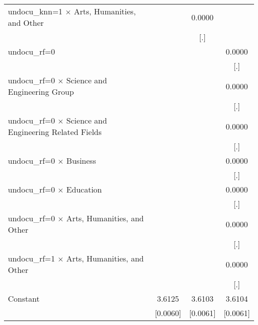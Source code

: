 \begin{table}[htbp]
\begin{tabular}{l*{3}{c}}
\addlinespace
undocu\_knn=1 $\times$ Arts, Humanities, and Other&                     &      0.0000         &                     \\
                    &                     &         [.]         &                     \\
\addlinespace
undocu\_rf=0         &                     &                     &      0.0000         \\
                    &                     &                     &         [.]         \\
\addlinespace
undocu\_rf=0 $\times$ Science and Engineering Group&                     &                     &      0.0000         \\
                    &                     &                     &         [.]         \\
\addlinespace
undocu\_rf=0 $\times$ Science and Engineering Related Fields&                     &                     &      0.0000         \\
                    &                     &                     &         [.]         \\
\addlinespace
undocu\_rf=0 $\times$ Business&                     &                     &      0.0000         \\
                    &                     &                     &         [.]         \\
\addlinespace
undocu\_rf=0 $\times$ Education&                     &                     &      0.0000         \\
                    &                     &                     &         [.]         \\
\addlinespace
undocu\_rf=0 $\times$ Arts, Humanities, and Other&                     &                     &      0.0000         \\
                    &                     &                     &         [.]         \\
\addlinespace
undocu\_rf=1 $\times$ Arts, Humanities, and Other&                     &                     &      0.0000         \\
                    &                     &                     &         [.]         \\
\addlinespace
Constant            &      3.6125\sym{***}&      3.6103\sym{***}&      3.6104\sym{***}\\
                    &    [0.0060]         &    [0.0061]         &    [0.0061]         \\

\end{tabular}
\end{table}
